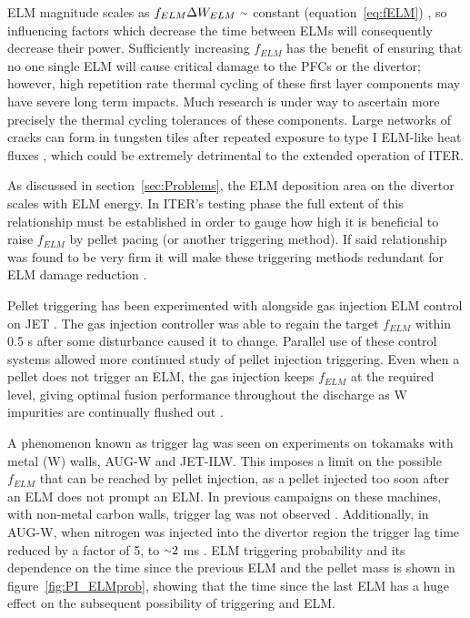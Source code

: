 \documentclass[11pt, twocolumn]{article}  %
\providecommand{\squiggle}{\raise.17ex\hbox{$\scriptstyle\sim$}} %
\newcommand{\citep}[1]{\cite{#1}}
\begin{document}
ELM magnitude scales as $f_{ELM}\Delta W_{ELM}~\squiggle$ constant (equation~\ref{eq:fELM}) \cite{Loarte2002,Leonard1999,KirkFF}, so influencing factors which decrease the time between ELMs will consequently decrease their power. Sufficiently increasing $f_{ELM}$ has the benefit of ensuring that no one single ELM will cause critical damage to the PFCs or the divertor; however, high repetition rate thermal cycling of these first layer components may have severe long term impacts. Much research is under way to ascertain more precisely the thermal cycling tolerances of these components. Large networks of cracks can form in tungsten tiles after repeated exposure to type I ELM-like heat fluxes \cite{Linke2011}, which could be extremely detrimental to the extended operation of ITER.

As discussed in section~\ref{sec:Problems}, the ELM deposition area on the divertor scales with ELM energy. In ITER's testing phase the full extent of this relationship must be established in order to gauge how high it is beneficial to raise $f_{ELM}$ by pellet pacing (or another triggering method). If said relationship was found to be very firm it will make these triggering methods redundant for ELM damage reduction \cite{Lang2013}.

Pellet triggering has been experimented with alongside gas injection ELM control on JET \cite{Lennholm2015}. The gas injection controller was able to regain the target $f_{ELM}$ within 0.5 s after some disturbance caused it to change. Parallel use of these control systems allowed more continued study of pellet injection triggering. Even when a pellet does not trigger an ELM, the gas injection keeps $f_{ELM}$ at the required level, giving optimal fusion performance throughout the discharge as W impurities are continually flushed out \cite{Lennholm2015}.

A phenomenon known as trigger lag was seen on experiments on tokamaks with metal (W) walls, AUG-W and JET-ILW. This imposes a limit on the possible $f_{ELM}$ that can be reached by pellet injection, as a pellet injected too soon after an ELM does not prompt an ELM. In previous campaigns on these machines, with non-metal carbon walls, trigger lag was not observed \cite{Baylor2015}. Additionally, in AUG-W, when nitrogen was injected into the divertor region the trigger lag time reduced by a factor of 5, to $\squiggle 2$ ms \citep{Baylor2015}. ELM triggering probability and its dependence on the time since the previous ELM and the pellet mass is shown in figure~\ref{fig:PI_ELMprob}, showing that the time since the last ELM has a huge effect on the subsequent possibility of triggering and ELM.
\end{document}
